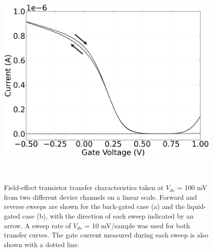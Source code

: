 \documentclass[
  letterpaper,
  DIV=11,
  numbers=noendperiod]{scrartcl}
\begin{document}
\begin{figure}
\begin{minipage}{0.01\linewidth}
~\end{minipage}%
%
\begin{minipage}{0.45\linewidth}
\includegraphics{figures/ch2/NTQ31C5_hysteresis.png}\end{minipage}%
%
\begin{minipage}{0.01\linewidth}
~\end{minipage}%

\caption{\label{fig-gating-hysteresis}Field-effect transistor transfer
characteristics taken at \(V_{ds}\) = 100 mV from two different device
channels on a linear scale. Forward and reverse sweeps are shown for the
back-gated case (a) and the liquid-gated case (b), with the direction of
each sweep indicated by an arrow. A sweep rate of \(V_{ds}\) = 10
mV/sample was used for both transfer curves. The gate current measured
during each sweep is also shown with a dotted line.}

\end{figure}%
\end{document}
